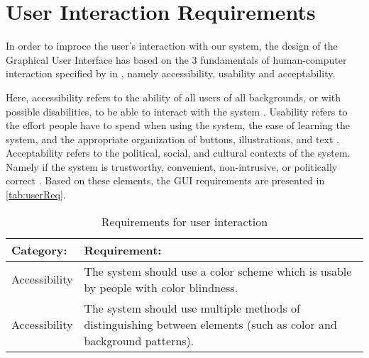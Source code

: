 \section{User Interaction Requirements}
In order to improce the user's interaction with our system, the design of the
Graphical User Interface has based on the 3 fundamentals of human-computer
interaction specified by \citeauthor{benyon2013designing} in
\citep[ch.4]{benyon2013designing}, namely accessibility, usability and
acceptability. 

Here, accessibility refers to the ability of all users of all backgrounds, or
with possible disabilities, to be able to interact with the
system \citep[p.77-80]{benyon2013designing}.
Usability refers to the effort people have to spend when using the system, the ease of
learning the system, and the appropriate organization of buttons, illustrations,
and text \citep[p.81-84]{benyon2013designing}. Acceptability refers to the
political, social, and cultural contexts of the system. Namely if the system is
trustworthy, convenient, non-intrusive, or politically correct \citep[p.84-85]{benyon2013designing}. Based on these
elements, the GUI requirements are presented in \autoref{tab:userReq}.

\begin{table}[H]\centering
\begin{tabular}{|l|l|}\hline
\textbf{Category:}	&	\textbf{Requirement:} \\\hline
Accessibility		&	The system should use a color scheme which is usable by people
with color blindness.\\\hline
Accessibility		&	The system should use multiple methods of distinguishing
between elements (such as color and background patterns).\\\hline
\end{tabular}
\caption{Requirements for user interaction}
\label{tab:userReq}
\end{table}

